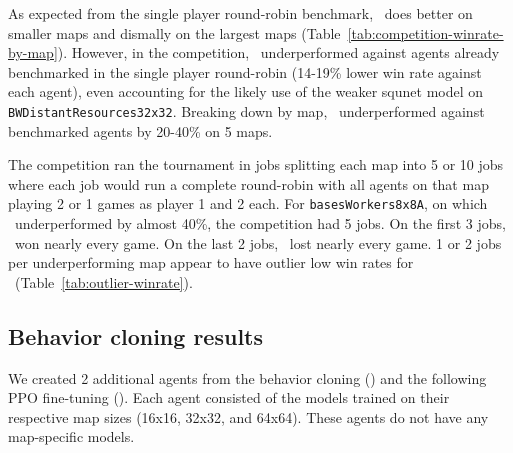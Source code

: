 \documentclass{article}
\begin{document}
As expected from the single player round-robin benchmark, \agentName\ does better on
smaller maps and dismally on the largest maps
(Table~\ref{tab:competition-winrate-by-map}). However, in the competition, \agentName\
underperformed against agents already benchmarked in the single player round-robin
(14-19\% lower win rate against each agent), even accounting for the likely use of
the weaker squnet model on \texttt{BWDistantResources32x32}.  Breaking down by map, 
\agentName\ underperformed against benchmarked agents by 20-40\% on 5 maps.

The competition ran the tournament in jobs splitting each map into 5 or 10 jobs where
each job would run a complete round-robin with all agents on that map playing 2 or 1
games as player 1 and 2 each. For \texttt{basesWorkers8x8A}, on which \agentName\
underperformed by almost 40\%, the competition had 5 jobs. On the first 3 jobs,
\agentName\ won nearly every game. On the last 2 jobs, \agentName\ lost nearly every
game. 1 or 2 jobs per underperforming map appear to have outlier low win rates
for \agentName\ (Table~\ref{tab:outlier-winrate}).

\subsection{Behavior cloning results}
\label{sec:behavior-cloning-results}
We created 2 additional agents from the behavior cloning (\bcAgent) and the following
PPO fine-tuning (\bcPPOAgent). Each agent consisted of the models trained on their
respective map sizes (16x16, 32x32, and 64x64). These agents do not have any
map-specific models.
\end{document}
